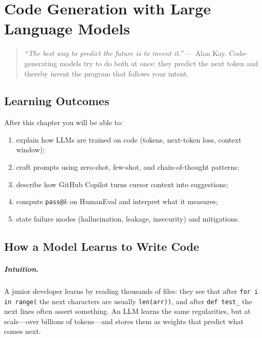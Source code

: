 \chapter{Code Generation with Large Language Models}
\label{ch:codegen}
\sloppy

\begin{quote}
\emph{``The best way to predict the future is to invent it.''} --- Alan Kay. Code-generating models try to do both at once: they predict the next token and thereby invent the program that follows your intent.
\end{quote}

\noindent{}
\vspace{0.4em}

\section*{Learning Outcomes}
After this chapter you will be able to:
\begin{enumerate}[label=(L\arabic*)]
    \item explain how LLMs are trained on code (tokens, next-token loss, context window);
    \item craft prompts using zero-shot, few-shot, and chain-of-thought patterns;
    \item describe how GitHub Copilot turns cursor context into suggestions;
    \item compute \texttt{pass@$k$} on HumanEval and interpret what it measures;
    \item state failure modes (hallucination, leakage, insecurity) and mitigations.
\end{enumerate}

\section{How a Model Learns to Write Code}
\label{sec:how-llm-code}
\paragraph{Intuition.} A junior developer learns by reading thousands of files: they see that after \texttt{for i in range(} the next characters are usually \texttt{len(arr))}, and after \texttt{def test\_} the next lines often assert something. An LLM learns the same regularities, but at scale---over billions of tokens---and stores them as weights that predict what comes next.

